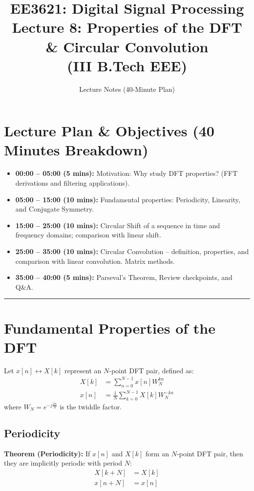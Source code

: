 \documentclass[11pt,a4paper]{article}
\title{\textbf{EE3621: Digital Signal Processing} \\ \Large Lecture 8: Properties of the DFT \& Circular Convolution \\ \large (III B.Tech EEE)}
\author{Lecture Notes (40-Minute Plan)}
\date{}
\begin{document}
\maketitle

\section{Lecture Plan \& Objectives (40 Minutes Breakdown)}
\begin{itemize}
    \item \textbf{00:00 -- 05:00 (5 mins):} Motivation: Why study DFT properties? (FFT derivations and filtering applications).
    \item \textbf{05:00 -- 15:00 (10 mins):} Fundamental properties: Periodicity, Linearity, and Conjugate Symmetry.
    \item \textbf{15:00 -- 25:00 (10 mins):} Circular Shift of a sequence in time and frequency domains; comparison with linear shift.
    \item \textbf{25:00 -- 35:00 (10 mins):} Circular Convolution -- definition, properties, and comparison with linear convolution. Matrix methods.
    \item \textbf{35:00 -- 40:00 (5 mins):} Parseval's Theorem, Review checkpoints, and Q\&A.
\end{itemize}

\noindent\rule{\textwidth}{0.5pt}

\section{Fundamental Properties of the DFT}

Let $x[n] \longleftrightarrow X[k]$ represent an $N$-point DFT pair, defined as:
\begin{align}
X[k] &= \sum_{n=0}^{N-1} x[n] W_N^{kn} \\
x[n] &= \frac{1}{N} \sum_{k=0}^{N-1} X[k] W_N^{-kn}
\end{align}
where $W_N = e^{-j\frac{2\pi}{N}}$ is the twiddle factor.

\subsection{Periodicity}
\textbf{Theorem (Periodicity):} If $x[n]$ and $X[k]$ form an $N$-point DFT pair, then they are implicitly periodic with period $N$:
\begin{align}
X[k+N] &= X[k] \\
x[n+N] &= x[n]
\end{align}
\end{document}
